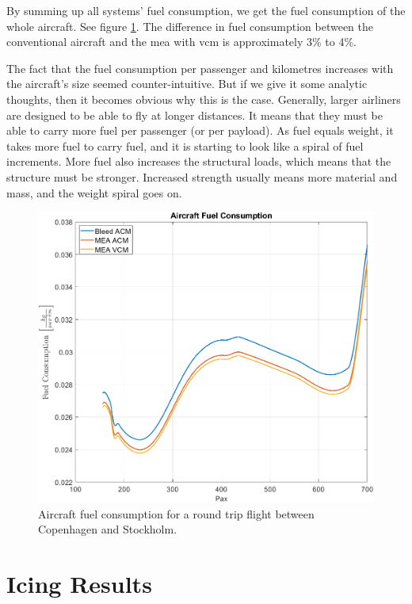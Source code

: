 \documentclass[english]{kththesis}
\begin{document}
\clearpage

By summing up all systems' fuel consumption, we get the fuel consumption of the whole aircraft. See figure \ref{fig:ACFuelCon}. The difference in fuel consumption between the conventional aircraft and the \acrshort{mea} with \acrshort{vcm} is approximately 3\% to 4\%.

The fact that the fuel consumption per passenger and kilometres increases with the aircraft's size seemed counter-intuitive. But if we give it some analytic thoughts, then it becomes obvious why this is the case. Generally, larger airliners are designed to be able to fly at longer distances. It means that they must be able to carry more fuel per passenger (or per payload). As fuel equals weight, it takes more fuel to carry fuel, and it is starting to look like a spiral of fuel increments. More fuel also increases the structural loads, which means that the structure must be stronger. Increased strength usually means more material and mass, and the weight spiral goes on.

\begin{figure}[!ht]
    \centering
    \includegraphics[width=1\textwidth]{Epictures/ACFuelCon.png}
    \caption{Aircraft fuel consumption for a round trip flight between Copenhagen and Stockholm.}
    \label{fig:ACFuelCon}
\end{figure}


\clearpage
\section{Icing Results}
\end{document}
